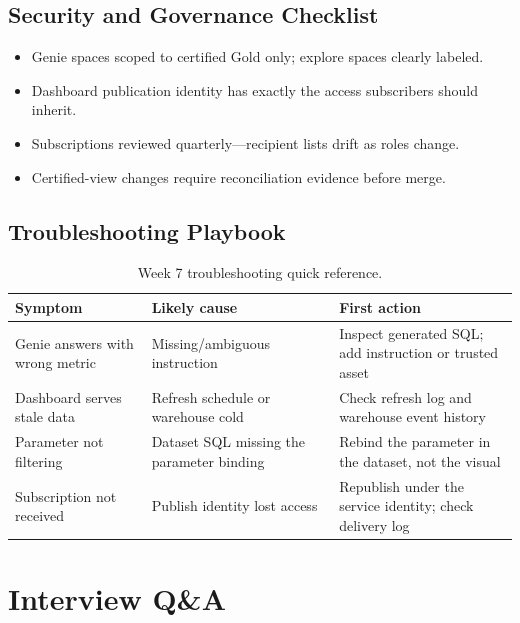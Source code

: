 \subsection{Security and Governance Checklist}
\begin{itemize}
    \item Genie spaces scoped to certified Gold only; explore spaces clearly labeled.
    \item Dashboard publication identity has exactly the access subscribers should inherit.
    \item Subscriptions reviewed quarterly---recipient lists drift as roles change.
    \item Certified-view changes require reconciliation evidence before merge.
\end{itemize}

\subsection{Troubleshooting Playbook}
\begin{table}[H]
\centering
\small
\begin{tabular}{@{}p{3.6cm}p{4.2cm}p{4.8cm}@{}}
\toprule
\textbf{Symptom} & \textbf{Likely cause} & \textbf{First action} \\
\midrule
Genie answers with wrong metric & Missing/ambiguous instruction & Inspect generated SQL; add instruction or trusted asset \\
Dashboard serves stale data & Refresh schedule or warehouse cold & Check refresh log and warehouse event history \\
Parameter not filtering & Dataset SQL missing the parameter binding & Rebind the parameter in the dataset, not the visual \\
Subscription not received & Publish identity lost access & Republish under the service identity; check delivery log \\
\bottomrule
\end{tabular}
\caption{Week 7 troubleshooting quick reference.}
\label{tab:ch7-trouble}
\end{table}

\section{Interview Q\&A}
